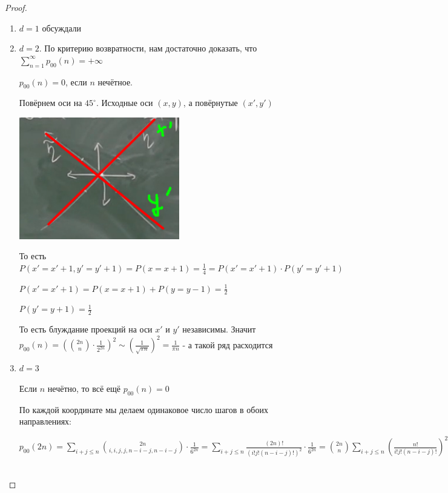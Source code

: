 \begin{proof}
    \begin{enumerate}
        \item $d = 1$ обсуждали
        \item {
            $d = 2$. По критерию возвратности, нам достаточно доказать, что $\sum\limits_{n=1}^\infty p_{00} (n) = +\infty$

            $p_{00} (n) = 0$, если $n$ нечётное. 
            
            Повёрнем оси на $45^{\circ}$. Исходные оси $(x, y)$, а повёрнутые $(x', y')$


            \begin{center}
                \includegraphics[width=7cm]{assets/04-descrete-random-process/poya-theorem-coordinates.png}
            \end{center}

            То есть $P(x' = x' + 1, y' = y' + 1) = P(x = x + 1) = \frac{1}{4} = P(x' = x' + 1) \cdot P(y' = y' + 1)$

            $P(x' = x' + 1) = P(x = x + 1) + P(y = y - 1) = \frac{1}{2}$

            $P(y' = y + 1) = \frac{1}{2}$

            То есть блуждание проекций на оси $x'$ и $y'$ независимы. Значит $p_{00}(n) =
            \left( \binom{2n}{n} \cdot \frac{1}{2^{2n}} \right)^2 \sim \left( \frac{1}{\sqrt{\pi n}} \right)^2 = \frac{1}{\pi n}$ - а такой ряд расходится
        }
        \item {
            $d = 3$

            Если $n$ нечётно, то всё ещё $p_{00} (n) = 0$

            По каждой координате мы делаем одинаковое число шагов в обоих направлениях: 
            
            $p_{00} (2n) = \sum\limits_{i + j \leqslant n} \binom{2n}{i, i, j, j, n - i -j, n - i - j} \cdot \frac{1}{6^{2n}} = \sum\limits_{i + j \leqslant n} \frac{(2n)!}{(i!j!(n-i-j)!)^2} \cdot \frac{1}{6^{2n}} = 
            \binom{2n}{n} \sum\limits_{i + j \leqslant n} \left( \frac{n!}{i!j!(n - i - j)!} \right)^2 \cdot \frac{1}{6^{2n}} \overset{*}{\leqslant} \underbrace{\frac{\binom{2n}{n}}{6^{2n}} \cdot 3^n}_{\sim \frac{1}{\sqrt{\pi n} \cdot \frac{1}{3^n}}} \cdot \max \binom{n}{i, j, n - i - j}$

}
\end{enumerate}
\end{proof}
